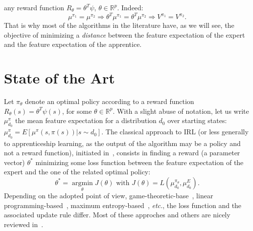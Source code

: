 \documentclass[tablecaption=bottom]{jmlr}
\newcommand{\argmin}{\operatorname*{argmin}}
\begin{document}
any reward function $R_\theta=\theta^T\psi$,
$\theta\in\mathbb{R}^p$. Indeed:
%
\begin{equation}  \mu^{\pi_1} = \mu^{\pi_2} \Rightarrow
\theta^T\mu^{\pi_1} = \theta^T\mu^{\pi_2} \Rightarrow V^{\pi_1} =
V^{\pi_2}. \label{memevaleur.eqn}
\end{equation}
%
%
That is why most of the algorithms in the literature have, as we
will see, the objective of minimizing a \textit{distance}  between
the feature expectation of the expert and the feature expectation of
the apprentice. %

\section{State of the Art}
\label{biblio.sec}

Let $\pi_\theta$ denote an optimal policy according to a reward
function $R_\theta(s)=\theta^T\psi(s)$, for some
$\theta\in\mathbb{R}^p$. With a slight abuse of notation, let us
write $\mu^\pi_{d_0}$ the mean feature expectation for a
distribution $d_0$ over starting states:
$\mu^\pi_{d_0}=E[\mu^\pi(s,\pi(s))|s\sim d_0]$. The classical
approach to IRL (or less generally to apprenticeship learning, as
the output of the algorithm may be a policy and not a reward
function), initiated in~\cite{abbeel2004apprenticeship}, consists in
finding a reward (a parameter vector) $\theta^*$ minimizing some
loss function between the feature expectation of the expert and the
one of the related optimal policy:
\begin{equation}
  \theta^* = \argmin_\theta J(\theta) \text{ with } J(\theta)=
  L(\mu^{\pi_\theta}_{d_0},\mu^E_{d_0}).\nonumber
\end{equation}
Depending on the adopted point of view,
game-theoretic-base~\cite{syed2008game}, linear
programming-based~\cite{syed2008apprenticeship}, maximum
entropy-based~\cite{ziebart2008maximum}, \textit{etc.}, the loss
function and the associated update rule differ. Most of these
approches and others are nicely reviewed in~\cite{neu2009training}.
\end{document}
